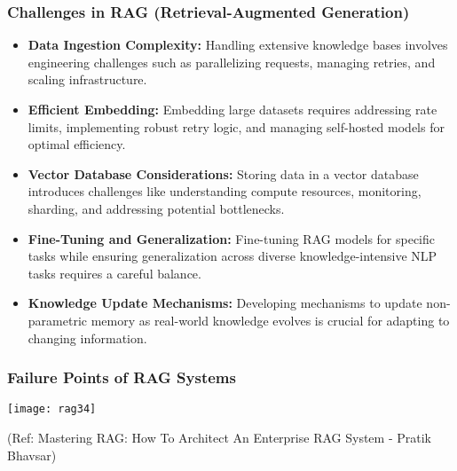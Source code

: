 \begin{frame}[fragile]\frametitle{Challenges in RAG (Retrieval-Augmented Generation)}
  \begin{itemize}
    \item \textbf{Data Ingestion Complexity:} Handling extensive knowledge bases involves engineering challenges such as parallelizing requests, managing retries, and scaling infrastructure.
    \item \textbf{Efficient Embedding:} Embedding large datasets requires addressing rate limits, implementing robust retry logic, and managing self-hosted models for optimal efficiency.
    \item \textbf{Vector Database Considerations:} Storing data in a vector database introduces challenges like understanding compute resources, monitoring, sharding, and addressing potential bottlenecks.
    \item \textbf{Fine-Tuning and Generalization:} Fine-tuning RAG models for specific tasks while ensuring generalization across diverse knowledge-intensive NLP tasks requires a careful balance.
    \item \textbf{Knowledge Update Mechanisms:} Developing mechanisms to update non-parametric memory as real-world knowledge evolves is crucial for adapting to changing information.
  \end{itemize}
\end{frame}



\begin{frame}[fragile]\frametitle{Failure Points of RAG Systems}


		\begin{center}
		\texttt{[image: rag34]}
		\end{center}

{\tiny (Ref: Mastering RAG: How To Architect An Enterprise RAG System - Pratik Bhavsar)}

\end{frame}

